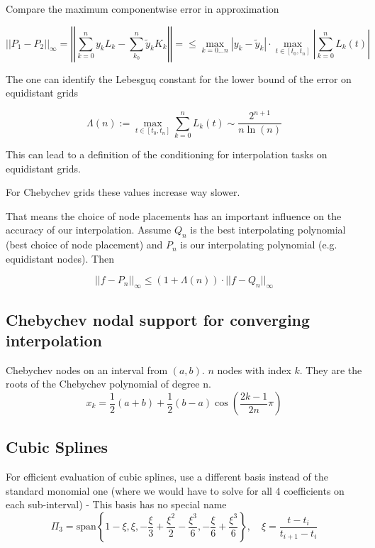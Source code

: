 \documentclass[
    a4paper,
    11pt
]{article}
\begin{document}
Compare the maximum componentwise error in approximation

\begin{equation}
    ||P_1 - P_2||_{\infty} = \left|\left| \sum_{k=0}^n y_k L_k - \sum_{k_0}^n
    \tilde{y}_k K_k \right|\right| =
    \leq \max_{k=0 \dots n} | y_k - \tilde{y}_k| \cdot \max_{t \in [t_0, t_n]}
    \left| \sum_{k=0}^n L_k(t) \right|
\end{equation}

The one can identify the Lebesguq constant for the lower bound of the error on
equidistant grids

\begin{equation}
    \Lambda(n) := \max_{t \in [t_0, t_n]} \sum_{k=0}^n L_k(t)
    \sim \frac{2^{n+1}}{n \ln(n)}
\end{equation}

This can lead to a definition of the conditioning for interpolation tasks on
equidistant grids.

For Chebychev grids these values increase way slower.

That means the choice of node placements has an important influence on the
accuracy of our interpolation. Assume $Q_n$ is the best interpolating
polynomial (best choice of node placement) and $P_n$ is our interpolating
polynomial (e.g. equidistant nodes). Then

\begin{equation}
    ||f - P_n||_{\infty} \leq (1 + \Lambda(n)) \cdot ||f - Q_n||_{\infty}
\end{equation}


\subsection{Chebychev nodal support for converging interpolation}

Chebychev nodes on an interval from $(a,b)$. $n$ nodes with index $k$. They are
the roots of the Chebychev polynomial of degree n.
\begin{equation}
    x_k = \frac{1}{2}(a+b) + \frac{1}{2}(b-a)\cos(\frac{2k-1}{2n}\pi)
\end{equation}

\subsection{Cubic Splines}

For efficient evaluation of cubic splines, use a different basis instead of the
standard monomial one (where we would have to solve for all 4 coefficients on
each sub-interval) - This basis has no special name
\begin{equation}
    \Pi_3 = \text{span}\left\{
        1 - \xi,
        \xi,
        -\frac{\xi}{3}+\frac{\xi^2}{2}-\frac{\xi^3}{6},
        -\frac{\xi}{6} + \frac{\xi^3}{6}
    \right\}, \quad \xi = \frac{t-t_i}{t_{i+1} - t_i}
\end{equation}
\end{document}
